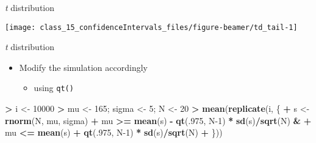 \documentclass[
  ignorenonframetext,
]{beamer}
\newenvironment{Shaded}{\begin{snugshade}}{\end{snugshade}}
\newcommand{\DecValTok}[1]{\textcolor[rgb]{0.00,0.00,0.81}{#1}}
\newcommand{\FunctionTok}[1]{\textcolor[rgb]{0.13,0.29,0.53}{\textbf{#1}}}
\newcommand{\NormalTok}[1]{#1}
\newcommand{\OtherTok}[1]{\textcolor[rgb]{0.56,0.35,0.01}{#1}}
\newcommand{\SpecialCharTok}[1]{\textcolor[rgb]{0.81,0.36,0.00}{\textbf{#1}}}
\providecommand{\tightlist}{%
  \setlength{\itemsep}{0pt}\setlength{\parskip}{0pt}}
\begin{document}
\begin{frame}{\emph{t} distribution}
\label{t-distribution-2}
\begin{center}\texttt{[image: class\_15\_confidenceIntervals\_files/figure-beamer/td\_tail-1]} \end{center}
\end{frame}

\begin{frame}[fragile]{\emph{t} distribution}
\label{t-distribution-3}
\begin{itemize}
\tightlist
\item
  Modify the simulation accordingly

  \begin{itemize}
  \tightlist
  \item
    using \texttt{qt()}
  \end{itemize}
\end{itemize}

\begin{Shaded}
\begin{Highlighting}[]
\SpecialCharTok{\textgreater{}}\NormalTok{ i }\OtherTok{\textless{}{-}} \DecValTok{10000}
\SpecialCharTok{\textgreater{}}\NormalTok{ mu }\OtherTok{\textless{}{-}} \DecValTok{165}\NormalTok{; sigma }\OtherTok{\textless{}{-}} \DecValTok{5}\NormalTok{; N }\OtherTok{\textless{}{-}} \DecValTok{20}
\SpecialCharTok{\textgreater{}} \FunctionTok{mean}\NormalTok{(}\FunctionTok{replicate}\NormalTok{(i, \{}
\SpecialCharTok{+}\NormalTok{    s }\OtherTok{\textless{}{-}} \FunctionTok{rnorm}\NormalTok{(N, mu, sigma)}
\SpecialCharTok{+}\NormalTok{    mu }\SpecialCharTok{\textgreater{}=} \FunctionTok{mean}\NormalTok{(s) }\SpecialCharTok{{-}} \FunctionTok{qt}\NormalTok{(.}\DecValTok{975}\NormalTok{, N}\DecValTok{{-}1}\NormalTok{) }\SpecialCharTok{*} \FunctionTok{sd}\NormalTok{(s)}\SpecialCharTok{/}\FunctionTok{sqrt}\NormalTok{(N) }\SpecialCharTok{\&}
\SpecialCharTok{+}\NormalTok{    mu }\SpecialCharTok{\textless{}=} \FunctionTok{mean}\NormalTok{(s) }\SpecialCharTok{+} \FunctionTok{qt}\NormalTok{(.}\DecValTok{975}\NormalTok{, N}\DecValTok{{-}1}\NormalTok{) }\SpecialCharTok{*} \FunctionTok{sd}\NormalTok{(s)}\SpecialCharTok{/}\FunctionTok{sqrt}\NormalTok{(N)}
\SpecialCharTok{+}\NormalTok{ \}))}
\end{Highlighting}
\end{Shaded}
\end{frame}
\end{document}
